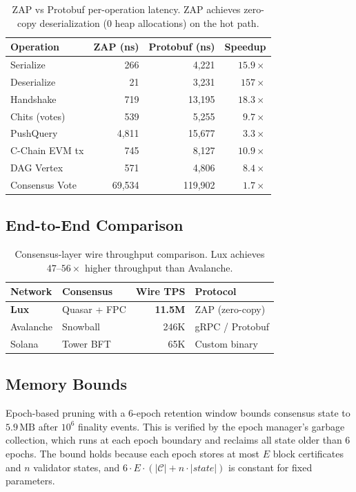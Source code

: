 \begin{table}[ht]
\centering
\small
\begin{tabular}{@{}lrrr@{}}
\toprule
\textbf{Operation} & \textbf{ZAP (ns)} & \textbf{Protobuf (ns)} & \textbf{Speedup} \\
\midrule
Serialize         & 266    & 4{,}221   & $15.9\times$ \\
Deserialize       & 21     & 3{,}231   & $157\times$ \\
Handshake         & 719    & 13{,}195  & $18.3\times$ \\
Chits (votes)     & 539    & 5{,}255   & $9.7\times$ \\
PushQuery         & 4{,}811 & 15{,}677 & $3.3\times$ \\
C-Chain EVM tx    & 745    & 8{,}127   & $10.9\times$ \\
DAG Vertex        & 571    & 4{,}806   & $8.4\times$ \\
Consensus Vote    & 69{,}534 & 119{,}902 & $1.7\times$ \\
\bottomrule
\end{tabular}
\caption{ZAP vs Protobuf per-operation latency. ZAP achieves zero-copy
deserialization (0 heap allocations) on the hot path.}
\label{tab:zapvsproto}
\end{table}

\subsection{End-to-End Comparison}

\begin{table}[ht]
\centering
\begin{tabular}{@{}llrl@{}}
\toprule
\textbf{Network} & \textbf{Consensus} & \textbf{Wire TPS} & \textbf{Protocol} \\
\midrule
\textbf{Lux}  & Quasar + FPC & \textbf{11.5M} & ZAP (zero-copy) \\
Avalanche      & Snowball     & 246K           & gRPC / Protobuf \\
Solana         & Tower BFT    & 65K            & Custom binary \\
\bottomrule
\end{tabular}
\caption{Consensus-layer wire throughput comparison.
Lux achieves $47\text{--}56\times$ higher throughput than Avalanche.}
\label{tab:comparison}
\end{table}

\subsection{Memory Bounds}

Epoch-based pruning with a 6-epoch retention window bounds consensus state to
$5.9\,\text{MB}$ after $10^6$ finality events. This is verified by the
epoch manager's garbage collection, which runs at each epoch boundary and
reclaims all state older than 6 epochs. The bound holds because each epoch
stores at most $E$ block certificates and $n$ validator states, and
$6 \cdot E \cdot (|\mathcal{C}| + n \cdot |\mathit{state}|)$ is constant
for fixed parameters.


